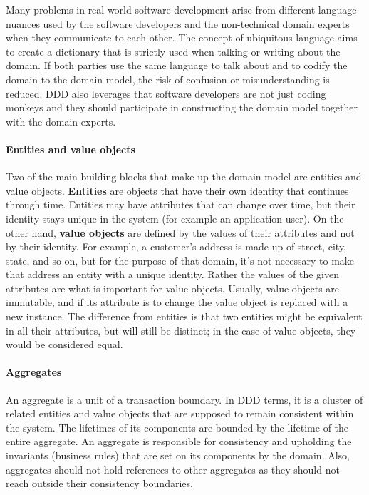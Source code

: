 \documentclass{book}
\begin{document}
Many problems in real-world software development arise from different
language nuances used by the software developers and the non-technical
domain experts when they communicate to each other. The concept of
ubiquitous language aims to create a dictionary that is strictly used
when talking or writing about the domain. If both parties use the same
language to talk about and to codify the domain to the domain model, the
risk of confusion or misunderstanding is reduced. DDD also leverages
that software developers are not just coding monkeys and they should
participate in constructing the domain model together with the domain
experts.

\paragraph{Entities and value objects}\label{entities-and-value-objects}

Two of the main building blocks that make up the domain model are
entities and value objects. \textbf{Entities} are objects that have
their own identity that continues through time. Entities may have
attributes that can change over time, but their identity stays unique in
the system (for example an application user). On the other hand,
\textbf{value objects} are defined by the values of their attributes and
not by their identity. For example, a customer's address is made up of
street, city, state, and so on, but for the purpose of that domain, it's
not necessary to make that address an entity with a unique identity.
Rather the values of the given attributes are what is important for
value objects. Usually, value objects are immutable, and if its
attribute is to change the value object is replaced with a new instance.
The difference from entities is that two entities might be equivalent in
all their attributes, but will still be distinct; in the case of value
objects, they would be considered equal.

\paragraph{Aggregates}\label{aggregates}

An aggregate is a unit of a transaction boundary. In DDD terms, it is a
cluster of related entities and value objects that are supposed to
remain consistent within the system. The lifetimes of its components are
bounded by the lifetime of the entire aggregate. An aggregate is
responsible for consistency and upholding the invariants (business
rules) that are set on its components by the domain. Also, aggregates
should not hold references to other aggregates as they should not reach
outside their consistency boundaries.
\end{document}
